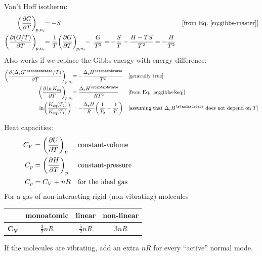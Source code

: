 \documentclass[11pt,a4paper,twoside]{article}
\numberwithin{equation}{section}
\newcommand{\eqn}[1]{Eq.~\eqref{#1}}
\newcommand{\DrG}{\ensuremath{\Delta_{\mathrm{r}}G}}
\newcommand{\DrH}{\ensuremath{\Delta_{\mathrm{r}}H}}
\newcommand{\std}{^{\standardstate}}
\begin{document}
Van't Hoff isotherm:
\begin{align}
\qty(\pdv{G}{T})_{\!p,n_i} \!\! & = -S & &
\text{[from \eqn{eq:gibbs-master}]} \\
\qty(\pdv{(G/T)}{T})_{\!p,n_i} \!\! & =
\frac{1}{T} \qty(\pdv{G}{T})_{\!p,n_i} \!\! - \ 
\frac{G}{T^2} = -\frac{S}{T} - \frac{H - TS}{T^2} = -\frac{H}{T^2}
\end{align}
Also works if we replace the Gibbs energy with energy difference:
\begin{align}
    \qty(\pdv{(\DrG\std/T)}{T})_{\!p,n_i} \!\! & = 
    -\frac{\DrH\std}{T^2} & & \text{[generally true]} \\
    \qty(\pdv{\ln K_{\rm eq}}{T})_{\!p,n_i} \!\! & = 
    \frac{\DrH\std}{R T^2} & & \text{[from \eqn{eq:gibbs-keq}]} \\
    \ln(\frac{K_{\rm eq}(T_2)}{K_{\rm eq}(T_1)}) & = 
    -\frac{\DrH}{R} \qty(\frac{1}{T_2} - \frac{1}{T_1}) & &
    \text{[assuming that $\DrH\std$ does not depend on $T$]}
\end{align}

Heat capacities:
\begin{align}
    C_{V} & = \qty(\pdv{U}{T})_{V} & & \text{constant-volume} \\
    C_{p} & = \qty(\pdv{H}{T})_{p} & & \text{constant-pressure} \\
    C_{p} & = C_{V} + n R & & \text{for the ideal gas
    \hspace*{0.45\columnwidth}}
\end{align}
For a gas of non-interacting rigid (non-vibrating) molecules

\begin{center}
\begin{tabularx}{0.675\textwidth}{|C|C|C|C|}
    \hline
     & \textbf{monoatomic} & \textbf{linear} & \textbf{non-linear} \\
    \hline
    \rule[-1.25em]{0pt}{3.5em}$\bm{C_{V}}$ & 
        $\displaystyle \frac{3}{2} n R$ &
        $\displaystyle \frac{5}{2} n R$ & 
        $\displaystyle 3 n R$ \\
    \hline
\end{tabularx}
\end{center}
If the molecules are vibrating, add an extra $n R$ for every ``active'' normal mode.
\end{document}
